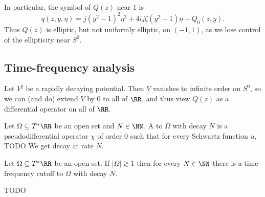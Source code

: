 In particular, the symbol of $Q(z)$ near $1$ is
$$q(z, y, \eta) = j(y^2 - 1)^2 \eta^2 + 4ij\zeta(y^2 - 1)\eta - Q_0(z, y).$$
Thus $Q(z)$ is elliptic, but not uniformly elliptic, on $(-1, 1)$, as we lose control of the ellipticity near $S^0$.

\subsection{Time-frequency analysis}
Let $V^\sharp$ be a rapidly decaying potential.
Then $V$ vanishes to infinite order on $S^0$, so we can (and do) extend $V$ by $0$ to all of $\RR$, and thus view $Q(z)$ as a differential operator on all of $\RR$.

\begin{definition}
Let $\Omega \subseteq T^*\RR$ be an open set and $N \in \NN$.
A  to $\Omega$ with decay $N$ is a pseudodifferential operator $\chi$ of order $0$ such that for every Schwartz function $u$, TODO We get decay at rate $N$.
\end{definition}

\begin{lemma}\label{uncertainty principle converse}
Let $\Omega \subseteq T^*\RR$ be an open set.
If $|\Omega| \gtrsim 1$ then for every $N \in \NN$ there is a time-frequency cutoff to $\Omega$ with decay $N$.
\end{lemma}

TODO

